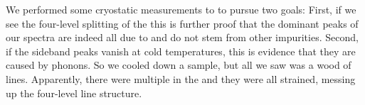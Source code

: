 		\begin{figure}[tp]
			\begin{subfigure}[t]{ 0.49\linewidth}
				\centering
				\caption{}
				\label{subfig::roomtep2}
			\end{subfigure}
			\hfill
			\begin{subfigure}[t]{ 0.49\linewidth}
				\centering
				\caption{}
				\label{subfig::cryo2}
			\end{subfigure}
			\caption{}
			\label{fig::rt_vs_cryo2}
		\end{figure}

		We performed some cryostatic measurements to to pursue two goals:
		First, if we see the four-level splitting of the \ZPL this is further proof that the dominant peaks of our spectra are indeed all due to \sivs and do not stem from other impurities.
		Second, if the sideband peaks vanish at cold temperatures, this is evidence that they are caused by phonons.
		So we cooled down a sample, but all we saw was a wood of lines.
		Apparently, there were multiple \sivs in the \nds and they were all strained, messing up the four-level line structure.
